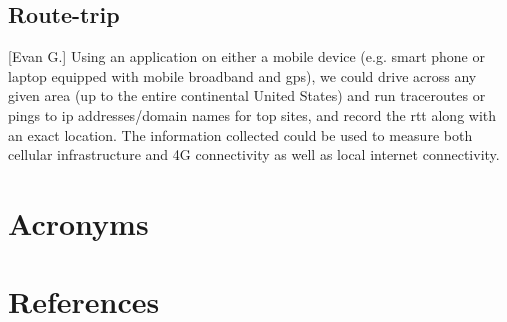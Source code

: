 \documentclass[12pt]{article}
\begin{document}
\subsection{Route-trip}[Evan G.]
Using an application on either a mobile device (e.g. smart phone or laptop equipped with mobile broadband and \acrshort{gps}), we could drive across any given area (up to the entire continental United States) and run traceroutes or pings to \acrshort{ip} addresses/domain names for top sites, and record the \acrshort{rtt} along with an exact location. The information collected could be used to measure both cellular infrastructure and 4G connectivity as well as local internet connectivity.

\singlespacing
\let\endsection\section
\renewcommand{\section}[2]{}%

\newpage
\endsection{Acronyms}
\printglossary[type=\acronymtype]

\newpage
\endsection{References}


\end{document}
